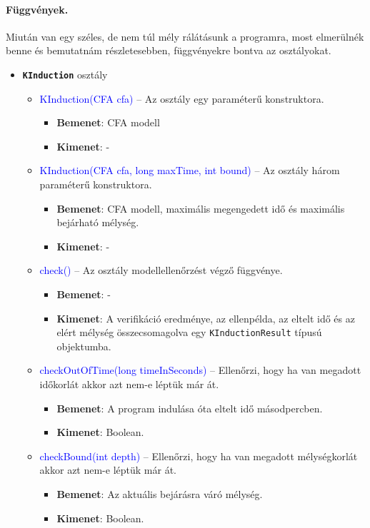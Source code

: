 \paragraph{Függvények.}
Miután van egy széles, de nem túl mély rálátásunk a programra, most elmerülnék benne és bemutatnám részletesebben, függvényekre bontva az osztályokat.
\begin{itemize}
	\item \textbf{\texttt{KInduction}} osztály
	\begin{itemize}
		\item \textcolor{blue}{KInduction(CFA cfa)} -- Az osztály egy paraméterű konstruktora.
		\begin{itemize}
			\item \textbf{Bemenet}: CFA modell
			\item \textbf{Kimenet}: -
		\end{itemize}
	
		\item \textcolor{blue}{KInduction(CFA cfa, long maxTime, int bound)} -- Az osztály három paraméterű konstruktora.
		\begin{itemize}
			\item \textbf{Bemenet}: CFA modell, maximális megengedett idő és maximális bejárható mélység.
			\item \textbf{Kimenet}: -
		\end{itemize}
	
		\item \textcolor{blue}{check()} -- Az osztály modellellenőrzést végző függvénye.
		\begin{itemize}
			\item \textbf{Bemenet}: -
			\item \textbf{Kimenet}: A verifikáció eredménye, az ellenpélda, az eltelt idő és az elért mélység összecsomagolva egy \texttt{KInductionResult} típusú objektumba.
		\end{itemize}
	
		\item \textcolor{blue}{checkOutOfTime(long timeInSeconds)} -- Ellenőrzi, hogy ha van megadott időkorlát akkor azt nem-e léptük már át.
		\begin{itemize}
			\item \textbf{Bemenet}: A program indulása óta eltelt idő másodpercben.
			\item \textbf{Kimenet}: Boolean.
		\end{itemize}
	
	
		\item \textcolor{blue}{checkBound(int depth)} -- Ellenőrzi, hogy ha van megadott mélységkorlát akkor azt nem-e léptük már át.
		\begin{itemize}
			\item \textbf{Bemenet}: Az aktuális bejárásra váró mélység.
			\item \textbf{Kimenet}: Boolean.
		\end{itemize}
	

\end{itemize}
\end{itemize}
